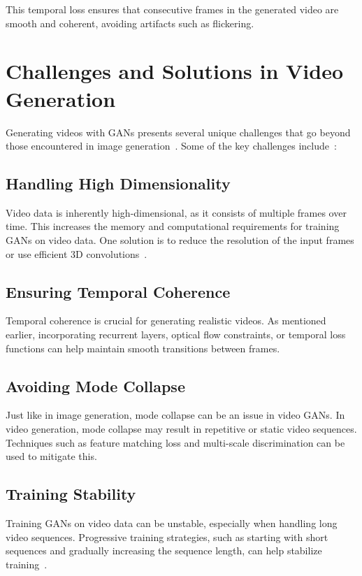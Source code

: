 This temporal loss ensures that consecutive frames in the generated video are smooth and coherent, avoiding artifacts such as flickering.

\section{Challenges and Solutions in Video Generation}
Generating videos with GANs presents several unique challenges that go beyond those encountered in image generation~\cite{chen2017coherent}. Some of the key challenges include~\cite{li2024survey}:

\subsection{Handling High Dimensionality}
Video data is inherently high-dimensional, as it consists of multiple frames over time. This increases the memory and computational requirements for training GANs on video data. One solution is to reduce the resolution of the input frames or use efficient 3D convolutions~\cite{tulyakov2017mocogan}.

\subsection{Ensuring Temporal Coherence}
Temporal coherence is crucial for generating realistic videos. As mentioned earlier, incorporating recurrent layers, optical flow constraints, or temporal loss functions can help maintain smooth transitions between frames.

\subsection{Avoiding Mode Collapse}
Just like in image generation, mode collapse can be an issue in video GANs. In video generation, mode collapse may result in repetitive or static video sequences. Techniques such as feature matching loss and multi-scale discrimination can be used to mitigate this.

\subsection{Training Stability}
Training GANs on video data can be unstable, especially when handling long video sequences. Progressive training strategies, such as starting with short sequences and gradually increasing the sequence length, can help stabilize training~\cite{chen2017coherent}.

